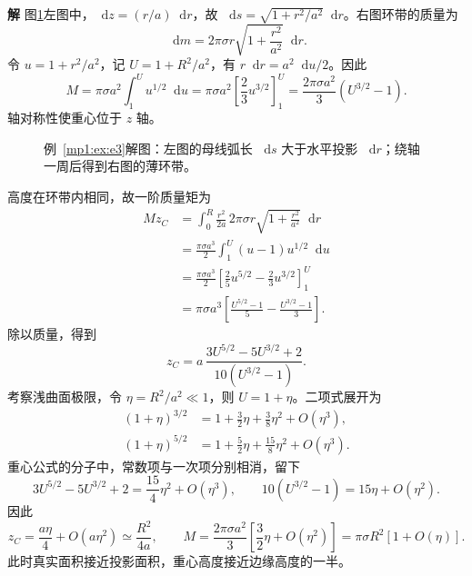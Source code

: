 \documentclass[11pt,openany,fontset=fandol]{ctexbook}
\theoremstyle{definition}\newtheorem{example}{例}[chapter]\newtheorem{exercise}{习题}[chapter]
\newcommand{\SolutionStart}{\par\medskip\ifdim\pagetotal>0pt\ifdim\dimexpr\pagegoal-\pagetotal\relax<3\baselineskip\newpage\fi\fi\noindent\textbf{解}\quad\ignorespaces}
\newenvironment{solution}{\SolutionStart}{\par\medskip}
\newcommand{\dd}{\mathop{}\!\mathrm d}\newcommand{\ee}{\mathrm e}\newcommand{\vct}[1]{\bm{#1}}
\begin{document}
\begin{solution}
图\ref{mp1:fig:e3-s}左图中，$\dd z=(r/a)\dd r$，故 $\dd s=\sqrt{1+r^2/a^2}\dd r$。右图环带的质量为
\[
\dd m=2\pi\sigma r\sqrt{1+\frac{r^2}{a^2}}\dd r.
\]
令 $u=1+r^2/a^2$，记 $U=1+R^2/a^2$，有 $r\dd r=a^2\dd u/2$。因此
\[
M=\pi\sigma a^2\int_1^Uu^{1/2}\dd u
=\pi\sigma a^2\left[\frac23u^{3/2}\right]_1^U
=\frac{2\pi\sigma a^2}{3}(U^{3/2}-1).
\]
轴对称性使重心位于 $z$ 轴。

\begin{figure}[H]\centering

\caption{例~\ref{mp1:ex:e3}解图：左图的母线弧长 $\dd s$ 大于水平投影 $\dd r$；绕轴一周后得到右图的薄环带。}\label{mp1:fig:e3-s}
\end{figure}

高度在环带内相同，故一阶质量矩为
\begin{align*}
Mz_C&=\int_0^R\frac{r^2}{2a}\,2\pi\sigma r\sqrt{1+\frac{r^2}{a^2}}\dd r\\
&=\frac{\pi\sigma a^3}{2}\int_1^U(u-1)u^{1/2}\dd u\\
&=\frac{\pi\sigma a^3}{2}\left[\frac25u^{5/2}-\frac23u^{3/2}\right]_1^U\\
&=\pi\sigma a^3\left[\frac{U^{5/2}-1}{5}-\frac{U^{3/2}-1}{3}\right].
\end{align*}
除以质量，得到
\[
z_C=a\,\frac{3U^{5/2}-5U^{3/2}+2}{10(U^{3/2}-1)}.
\]
考察浅曲面极限，令 $\eta=R^2/a^2\ll1$，则 $U=1+\eta$。二项式展开为
\[
\begin{aligned}
(1+\eta)^{3/2}&=1+\frac32\eta+\frac38\eta^2+O(\eta^3),\\
(1+\eta)^{5/2}&=1+\frac52\eta+\frac{15}{8}\eta^2+O(\eta^3).
\end{aligned}
\]
重心公式的分子中，常数项与一次项分别相消，留下
\[
3U^{5/2}-5U^{3/2}+2=\frac{15}{4}\eta^2+O(\eta^3),
\qquad 10(U^{3/2}-1)=15\eta+O(\eta^2).
\]
因此
\[
z_C=\frac{a\eta}{4}+O(a\eta^2)\simeq\frac{R^2}{4a},
\qquad M=\frac{2\pi\sigma a^2}{3}\left[\frac32\eta+O(\eta^2)\right]
=\pi\sigma R^2[1+O(\eta)].
\]
此时真实面积接近投影面积，重心高度接近边缘高度的一半。
\end{solution}
\end{document}
